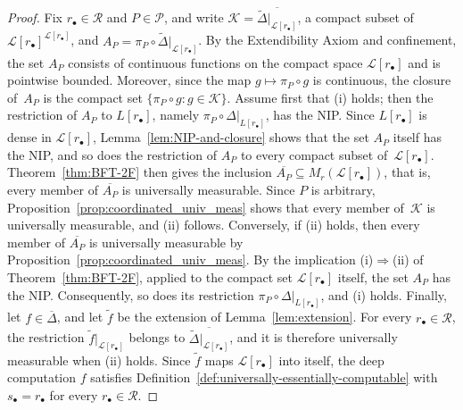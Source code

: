 \documentclass[psamsfonts]{amsart}
\theoremstyle{definition}
\theoremstyle{remark}
\numberwithin{equation}{section}
\begin{document}
\begin{proof}
  Fix $r_\bullet\in \mathscr{R}$ and $P\in\mathcal{P}$, and write $\mathcal{K}=\overline{\tilde\Delta|_{\mathcal{L}[r_\bullet]}}$, a compact subset of $\mathcal{L}[r_\bullet]^{\mathcal{L}[r_\bullet]}$, and $A_P=\pi_P\circ\tilde\Delta|_{\mathcal{L}[r_\bullet]}$.
  By the Extendibility Axiom and confinement, the set $A_P$ consists of continuous functions on the compact space $\mathcal{L}[r_\bullet]$ and is pointwise bounded.
  Moreover, since the map $g\mapsto\pi_P\circ g$ is continuous, the closure of~$A_P$ is the compact set $\{\pi_P\circ g:g\in \mathcal{K}\}$.
  Assume first that (i) holds; then the restriction of $A_P$ to $L[r_\bullet]$, namely $\pi_P\circ\Delta|_{L[r_\bullet]}$, has the NIP.
  Since $L[r_\bullet]$ is dense in $\mathcal{L}[r_\bullet]$, Lemma~\ref{lem:NIP-and-closure} shows that the set $A_P$ itself has the NIP, and so does the restriction of $A_P$ to every compact subset of~$\mathcal{L}[r_\bullet]$.
  Theorem~\ref{thm:BFT-2F} then gives the inclusion $\overline{A_P}\subseteq M_r(\mathcal{L}[r_\bullet])$, that is, every member of $\overline{A_P}$ is universally measurable.
  Since $P$ is arbitrary, Proposition~\ref{prop:coordinated_univ_meas} shows that every member of~$\mathcal{K}$ is universally measurable, and (ii) follows.
  Conversely, if (ii) holds, then every member of $\overline{A_P}$ is universally measurable by Proposition~\ref{prop:coordinated_univ_meas}.
  By the implication (i)$\Rightarrow$(ii) of Theorem~\ref{thm:BFT-2F}, applied to the compact set $\mathcal{L}[r_\bullet]$ itself, the set $A_P$ has the NIP.
  Consequently, so does its restriction $\pi_P\circ\Delta|_{L[r_\bullet]}$, and (i) holds.
  Finally, let $f\in\overline{\Delta}$, and let $\tilde f$ be the extension of Lemma~\ref{lem:extension}.
  For every $r_\bullet\in\mathscr{R}$, the restriction $\tilde f|_{\mathcal{L}[r_\bullet]}$ belongs to $\overline{\tilde\Delta|_{\mathcal{L}[r_\bullet]}}$, and it is therefore universally measurable when (ii) holds.
  Since $\tilde f$ maps $\mathcal{L}[r_\bullet]$ into itself, the deep computation $f$ satisfies Definition~\ref{def:universally-essentially-computable} with $s_\bullet=r_\bullet$ for every $r_\bullet\in \mathscr{R}$.
\end{proof}
\end{document}
